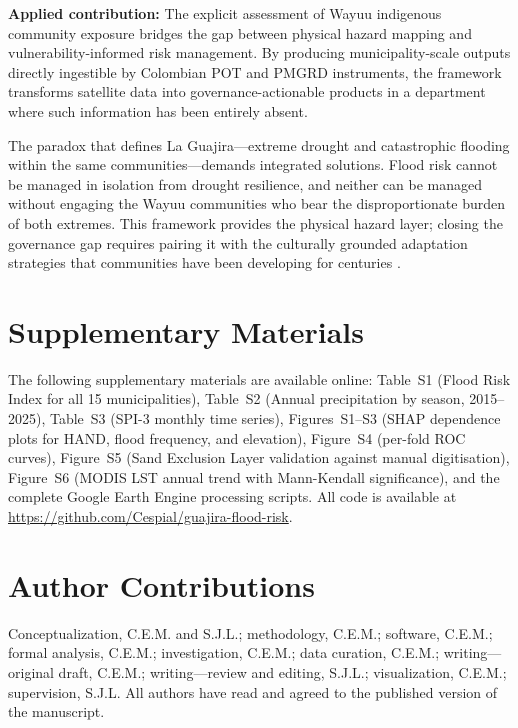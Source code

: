 \documentclass{article}
\begin{document}
\textbf{Applied contribution:} The explicit assessment of Wayuu indigenous community exposure bridges the gap between physical hazard mapping and vulnerability-informed risk management. By producing municipality-scale outputs directly ingestible by Colombian POT and PMGRD instruments, the framework transforms satellite data into governance-actionable products in a department where such information has been entirely absent.

The paradox that defines La Guajira---extreme drought and catastrophic flooding within the same communities---demands integrated solutions. Flood risk cannot be managed in isolation from drought resilience, and neither can be managed without engaging the Wayuu communities who bear the disproportionate burden of both extremes. This framework provides the physical hazard layer; closing the governance gap requires pairing it with the culturally grounded adaptation strategies that communities have been developing for centuries \citep{WayuuWaterGovernance2025}.

\section*{Supplementary Materials}

The following supplementary materials are available online: Table~S1 (Flood Risk Index for all 15 municipalities), Table~S2 (Annual precipitation by season, 2015--2025), Table~S3 (SPI-3 monthly time series), Figures~S1--S3 (SHAP dependence plots for HAND, flood frequency, and elevation), Figure~S4 (per-fold ROC curves), Figure~S5 (Sand Exclusion Layer validation against manual digitisation), Figure~S6 (MODIS LST annual trend with Mann-Kendall significance), and the complete Google Earth Engine processing scripts. All code is available at \url{https://github.com/Cespial/guajira-flood-risk}.

\section*{Author Contributions}

Conceptualization, C.E.M. and S.J.L.; methodology, C.E.M.; software, C.E.M.; formal analysis, C.E.M.; investigation, C.E.M.; data curation, C.E.M.; writing---original draft, C.E.M.; writing---review and editing, S.J.L.; visualization, C.E.M.; supervision, S.J.L. All authors have read and agreed to the published version of the manuscript.
\end{document}
